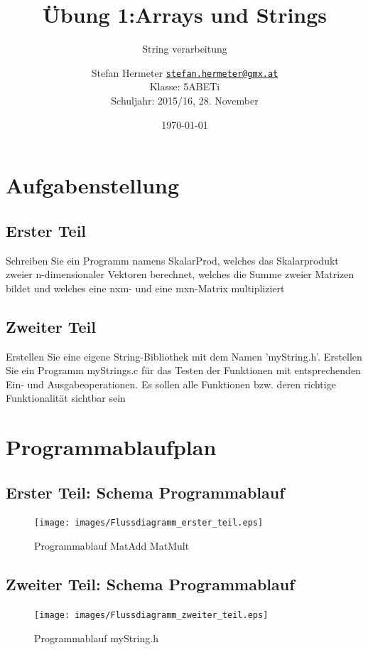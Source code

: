 \documentclass{scrartcl}
\newcommand{\mytitle}{Übung 1}
\begin{document}
\title{\mytitle:Arrays und Strings}
\subtitle{String verarbeitung}
\date{\today}
\author{Stefan Hermeter \texttt{\href{mailto:stefan.hermeter@gmx.at}{stefan.hermeter@gmx.at}}\\
  Klasse: 5ABETi\\
  Schuljahr: 2015/16, 28. November}
\maketitle
{}
\newpage
\tableofcontents
\listoffigures
\newpage
{}
\section{Aufgabenstellung}
\subsection{Erster Teil}
Schreiben Sie ein Programm namens SkalarProd, welches das Skalarprodukt zweier n-dimensionaler Vektoren berechnet, welches die Summe zweier Matrizen bildet und welches eine nxm- und eine mxn-Matrix multipliziert\\

\subsection{Zweiter Teil}
Erstellen Sie eine eigene String-Bibliothek mit dem Namen 'myString.h'. Erstellen Sie ein Programm myStrings.c für das Testen der Funktionen mit entsprechenden Ein- und Ausgabeoperationen. Es sollen alle Funktionen bzw. deren richtige Funktionalität sichtbar sein

\section{Programmablaufplan}
\subsection{Erster Teil: Schema Programmablauf}
\begin{figure}[H]
  \centering
  \texttt{[image: images/Flussdiagramm\_erster\_teil.eps]}
  \caption{Programmablauf MatAdd MatMult}
  \label{fig:digraph}
\end{figure}
\subsection{Zweiter Teil: Schema Programmablauf}
\begin{figure}[H]
  \centering
  \texttt{[image: images/Flussdiagramm\_zweiter\_teil.eps]}
  \caption{Programmablauf myString.h}
  \label{fig:digraph}
\end{figure}
\end{document}
